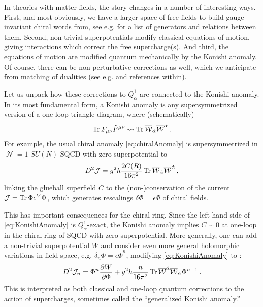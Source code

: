 \documentclass[11pt]{article}
\DeclareMathOperator{\calN}{\mathcal{N}}
\begin{document}
In theories with matter fields, the story changes in a number of interesting ways. First, and most obviously, we have a larger space of free fields to build gauge-invariant chiral words from, see e.g. \cite{CDSW, susyGTMM, Seiberg:2002jq} for a list of generators and relations between them. Second, non-trivial superpotentials modify classical equations of motion, giving interactions which correct the free supercharge(s). And third, the equations of motion are modified quantum mechanically by the Konishi anomaly. Of course, there can be non-perturbative corrections as well, which we anticipate from matching of dualities (see e.g. \cite{Tachikawa:2018sae} and references within).

Let us unpack how these corrections to $Q_{\alpha}^1$ are connected to the Konishi anomaly. In its most fundamental form, a Konishi anomaly is any supersymmetrized version of a one-loop triangle diagram, where (schematically)
\begin{equation}\label{eq:veryKonishi}
    \Tr F_{\mu\nu} \tilde{F}^{\mu\nu} \rightsquigarrow \Tr \overline{\mathcal{W}}_{\dot\alpha} \overline{\mathcal{W}}^{\dot\alpha}\,.
\end{equation}
For example, the usual chiral anomaly \eqref{eq:chiralAnomaly} is supersymmetrized in $\calN=1$ $SU(N)$ SQCD with zero superpotential to
\begin{equation}\label{eq:KonishiAnomaly}
    D^2\bar{\mathcal{J}} = g^2\hbar \frac{2C(R)}{16\pi^2} \Tr \overline{\mathcal{W}}_{\dot\alpha} \overline{\mathcal{W}}^{\dot\alpha}\,,
\end{equation}
linking the glueball superfield $C$ to the (non-)conservation of the current $\bar{\mathcal{J}} = \Tr \Phi e^V \bar\Phi$, which generates rescalings $\delta \bar{\Phi} = \epsilon \bar{\Phi}$ of chiral fields. 

This has important consequences for the chiral ring. Since the left-hand side of \eqref{eq:KonishiAnomaly} is $Q_\alpha^{1}$-exact, the Konishi anomaly implies $C\sim 0$ at one-loop in the chiral ring of SQCD with zero superpotential. More generally, one can add a non-trivial superpotential $W$ and consider even more general holomorphic variations in field space, e.g. $\delta_n \bar{\Phi} = \epsilon \bar{\Phi}^n$, modifying \eqref{eq:KonishiAnomaly} to \cite{CDSW, Tachikawa:2018sae}:
\begin{equation}
    D^2\bar{\mathcal{J}}_n = \bar{\Phi}^n \frac{\partial W}{\partial \Phi} + g^2\hbar \frac{n}{16\pi^2} \Tr \overline{\mathcal{W}}^{\dot\alpha} \overline{\mathcal{W}}_{\dot\alpha} \bar{\Phi}^{n-1}\,.
\end{equation}
This is interpreted as both classical and one-loop quantum corrections to the action of supercharges, sometimes called the ``generalized Konishi anomaly.''
\end{document}

